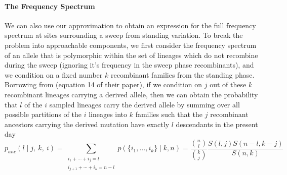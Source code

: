 \documentclass[a4paper,10pt]{article}
\begin{document}
\paragraph{The Frequency Spectrum} We can also use our approximation to obtain an expression for the full frequency spectrum at sites surrounding a sweep from standing variation. To break the problem into approachable components, we first consider the frequency spectrum of an allele that is polymorphic within the set of lineages which do not recombine during the sweep (ignoring it's frequency in the sweep phase recombinants), and we condition on a fixed number $k$ recombinant families from the standing phase. Borrowing from \cite{Pennings2006} (equation 14 of their paper), if we condition on $j$ out of these $k$ recombinant lineages carrying a derived allele, then we can obtain the probability that $l$ of the $i$ sampled lineages carry the derived allele by summing over all possible partitions of the $i$ lineages into $k$ families such that the $j$ recombinant ancestors carrying the derived mutation have exactly $l$ descendants in the present day
\begin{equation}
p_{anc}(l \mid j, ~k,~i) = \sum_{\substack{i_1+\cdots +i_j=l \\i_{j+1}+\cdots + i_k=n-l}} p(\{i_1,\dots,i_k\} \mid k, n) = \frac{ {n \choose l} }{ {k \choose j} }\frac{ S(l,j)  S(n-l,k-j)  }{ S(n,k) } \label{ESF_gives_freq_spec}
\end{equation}
\end{document}
